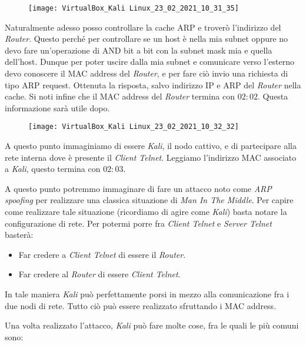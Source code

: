 \documentclass[14pt]{extreport}
\begin{document}
\begin{figure}[H]
\centering
\texttt{[image: VirtualBox\_Kali Linux\_23\_02\_2021\_10\_31\_35]}
\end{figure}

Naturalmente adesso posso controllare la cache ARP e troverò l'indirizzo del \textit{Router}. Questo perché per controllare se un host è nella mia subnet oppure no devo fare un'operazione di AND bit a bit con la subnet mask mia e quella dell'host. Dunque per poter uscire dalla mia subnet e comunicare verso l'esterno devo conoscere il MAC address del \textit{Router}, e per fare ciò invio una richiesta di tipo ARP request. Ottenuta la risposta, salvo indirizzo IP e ARP del \textit{Router} nella cache. Si noti infine che il MAC address del \textit{Router} termina con $02:02$. Questa informazione sarà utile dopo.

\begin{figure}[H]
\centering
\texttt{[image: VirtualBox\_Kali Linux\_23\_02\_2021\_10\_32\_32]}
\end{figure}


A questo punto immaginiamo di essere \textit{Kali}, il nodo cattivo, e di partecipare alla rete interna dove è presente il \textit{Client Telnet}. Leggiamo l'indirizzo MAC associato a \textit{Kali}, questo termina con $02:03$.

A questo punto potremmo immaginare di fare un attacco noto come \textit{ARP spoofing} per realizzare una classica situazione di \textit{Man In The Middle}.
Per capire come realizzare tale situazione (ricordiamo di agire come \textit{Kali}) basta notare la configurazione di rete. Per potermi porre fra \textit{Client Telnet} e \textit{Server Telnet} basterà:

\begin{itemize}
    \item Far credere a \textit{Client Telnet} di essere il \textit{Router}.
    
    \item Far credere al \textit{Router} di essere \textit{Client Telnet}.
\end{itemize}

In tale maniera \textit{Kali} può perfettamente porsi in mezzo alla comunicazione fra i due nodi di rete. Tutto ciò può essere realizzato sfruttando i MAC address. 

Una volta realizzato l'attacco, \textit{Kali} può fare molte cose, fra le quali le più comuni sono:
\end{document}

